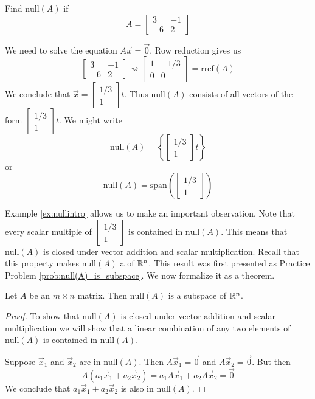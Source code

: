\documentclass{ximera}
\begin{document}
\begin{example}\label{ex:nullintro}Find $\mbox{null}(A)$ if
$$A=\begin{bmatrix}3&-1\\-6&2\end{bmatrix}$$
\begin{explanation}We need to solve the equation $A\vec{x}=\vec{0}$.  Row reduction gives us
$$\begin{bmatrix}3&-1\\-6&2\end{bmatrix}\rightsquigarrow\begin{bmatrix}1&-1/3\\0&0\end{bmatrix}=\mbox{rref}(A)$$
We conclude that $\vec{x}=\begin{bmatrix}1/3\\1\end{bmatrix}t$.  Thus $\mbox{null}(A)$ consists of all vectors of the form $\begin{bmatrix}1/3\\1\end{bmatrix}t$.  We might write
$$\mbox{null}(A)=\left\{\begin{bmatrix}1/3\\1\end{bmatrix}t\right\}$$ or
$$\mbox{null}(A)=\mbox{span}\left(\begin{bmatrix}1/3\\1\end{bmatrix}\right)$$
\end{explanation}
\end{example}
Example \ref{ex:nullintro} allows us to make an important observation. Note that every scalar multiple of $\begin{bmatrix}1/3\\1\end{bmatrix}$ is contained in $\mbox{null}(A)$.  This means that $\mbox{null}(A)$ is closed under vector addition and scalar multiplication.  Recall that this property makes $\mbox{null}(A)$ a  of $\mathbb{R}^n$.  This result was first presented as Practice Problem \ref{prob:null(A)_is_subspace}. We now formalize it as a theorem.

\begin{theorem}\label{th:nullsubspacern} Let $A$ be an $m\times n$ matrix.  Then $\mbox{null}(A)$ is a subspace of $\mathbb{R}^n$.
\end{theorem}
\begin{proof}To show that $\mbox{null}(A)$ is closed under vector addition and scalar multiplication we will show that a linear combination of any two elements of $\mbox{null}(A)$ is contained in $\mbox{null}(A)$.

Suppose $\vec{x}_1$ and $\vec{x}_2$ are in $\mbox{null}(A)$.  Then $A\vec{x}_1=\vec{0}$ and $A\vec{x}_2=\vec{0}$.  But then
$$A(a_1\vec{x}_1+a_2\vec{x}_2)=a_1A\vec{x}_1+a_2A\vec{x}_2=\vec{0}$$
We conclude that $a_1\vec{x}_1+a_2\vec{x}_2$ is also in $\mbox{null}(A)$.
\end{proof}
\end{document}

